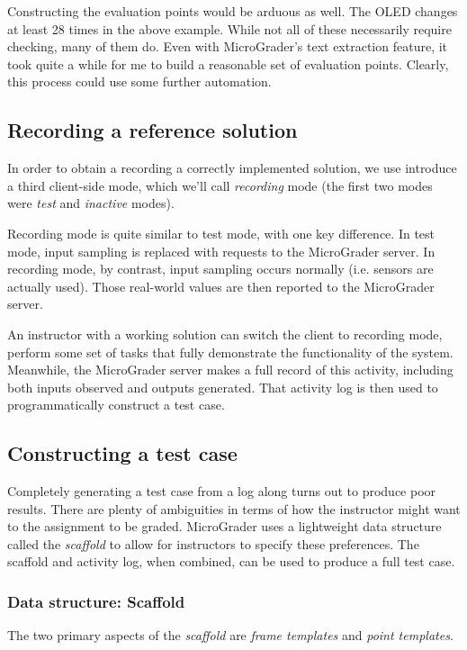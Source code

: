 \documentclass[12pt]{article}
\begin{document}
Constructing the evaluation points would be arduous as well.  The OLED changes at least 28 times in the above example.  While not all of these necessarily require checking, many of them do.  Even with MicroGrader's text extraction feature, it took quite a while for me to build a reasonable set of evaluation points.   Clearly, this process could use some further automation.

\subsection{Recording a reference solution}
In order to obtain a recording a correctly implemented solution, we use introduce a third client-side mode, which we'll call \textit{recording} mode (the first two modes were \textit{test} and \textit{inactive} modes). 

Recording mode is quite similar to test mode, with one key difference.  In test mode, input sampling is replaced with requests to the MicroGrader server.  In recording mode, by contrast, input sampling occurs normally (i.e. sensors are actually used).  Those real-world values are then reported to the MicroGrader server.

An instructor with a working solution can switch the client to recording mode, perform some set of tasks that fully demonstrate the functionality of the system.  Meanwhile, the MicroGrader server makes a full record of this activity, including both inputs observed and outputs generated.  That activity log is then used to programmatically construct a test case.

\subsection{Constructing a test case}
Completely generating a test case from a log along turns out to produce poor results.  There are plenty of ambiguities in terms of how the instructor might want to the assignment to be graded.  MicroGrader uses a lightweight data structure called the \textit{scaffold} to allow for instructors to specify these preferences.  The scaffold and activity log, when combined, can be used to produce a full test case.

\subsubsection{Data structure: Scaffold}
The two primary aspects of the \textit{scaffold} are \textit{frame templates} and \textit{point templates}.
\end{document}
